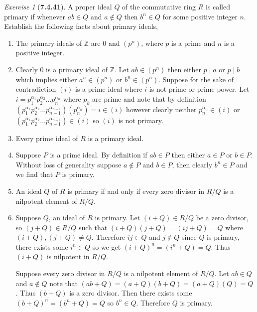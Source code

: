 \documentclass[12pt]{amsart}
\makeatletter
\theoremstyle{remark}
\newtheorem*{exercise}{Exercise}%
\def\ZZ{\ensuremath{\mathbb Z}}
\renewenvironment{proof}[1][\proofname]{\par\doublespacing
  \pushQED{\qed}%
  \normalfont \topsep6\p@\@plus6\p@\relax
  \list{}{%
    \settowidth{\leftmargin}{\itshape\proofname:\hskip\labelsep}%
    \setlength{\labelwidth}{0pt}%
    \setlength{\itemindent}{-\leftmargin}%
  }%
  \item[\hskip\labelsep\itshape#1\@addpunct{:}]\ignorespaces
}{%
  \popQED\endlist\@endpefalse
  \singlespacing
}
\theoremstyle{mycomment}
\makeatother
\begin{document}
\begin{exercise}[\textbf{7.4.41}] A proper ideal $Q$ of the commutative ring $R$ is called primary if whenever 
  $ab \in Q$ and $a \not\in Q$ then $b^n  \in Q$ for some positive integer $n$. Establish the following facts about 
  primary ideals, 
  \begin{enumerate}
  \item[(a)] The primary ideals of $\ZZ$ are $0$ and $(p^n)$, where $p$ is a prime and $n$ is a positive integer.
  \begin{proof} Clearly $0$ is a primary ideal of $\ZZ$. Let $ab \in (p^n)$ then either $p\mid a$ or $p\mid b$ which implies either $a^n  \in (p^n)$ or $b^n  \in (p^n)$.
    Suppose for the sake of contradiction $(i)$ is a prime ideal where $i$ is not prime or prime power. Let $i = p_1^{\alpha_1}p_2^{\alpha_2} \dots p_n^{\alpha_n}$ where $p_k$ are prime and 
    note that by definition $(p_1^{\alpha_1}p_2^{\alpha_2} \dots p_{n - 1}^{\alpha_{n - 1}})(p_n^{\alpha_n}) = i \in (i)$ however clearly neither $p_n^{\alpha_n} \in (i)$ or $(p_1^{\alpha_1}p_2^{\alpha_2} \dots p_{n - 1}^{\alpha_{n - 1}}) \in (i)$
    so $(i)$ is not primary. 
  \end{proof}
\vspace{.15in}

\item[(b)] Every prime ideal of $R$ is a primary ideal. 
\begin{proof} Suppose $P$ is a prime ideal. By definition if $ab \in P$ then either $a \in P$ or $b \in P$. Without loss of generality suppose 
  $a \not\in P$ and $b \in P$, then clearly $b^n \in P$ and we find that $P$ is primary. 
\end{proof}
\vspace{.15in}

\item[(c)] An ideal $Q$ of $R$ is primary if and only if every zero divisor in $R/Q$ is a nilpotent element of $R/Q$. 
\begin{proof} Suppose $Q$, an ideal of $R$ is primary. Let $(i + Q) \in R/Q$ be a zero divisor, so $(j + Q) \in R/Q$ such that $(i + Q)(j + Q) = (ij + Q) = Q$ where $(i + Q),(j + Q) \neq Q$. Therefore 
  $ij \in Q$ and $j \not\in Q$ since $Q$ is primary, there exists some $i^n \in Q$ so we get $(i + Q)^n = (i^n + Q) = Q$. Thus $(i + Q)$ is nilpotent in $R/Q$. 

  Suppose every zero divisor in $R/Q$ is a nilpotent element of $R/Q$. Let $ab \in Q$ and $a \not\in Q$ note that $(ab + Q) = (a + Q)(b + Q) = (a + Q)(Q) = Q$. Thus 
  $(b + Q)$ is a zero divisor. Then there exists some $(b + Q)^n = (b^n + Q) = Q$ so $b^n \in Q$. Therefore $Q$ is primary. 
\end{proof}
\vspace{.15in}


\end{enumerate}
\end{exercise}
\end{document}
